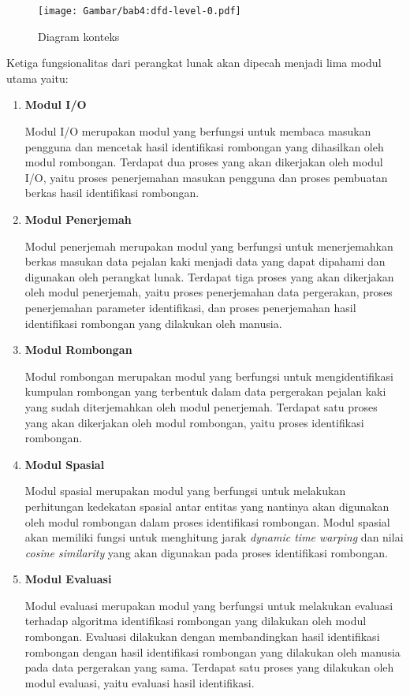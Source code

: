 \begin{figure}[h]
    \centering
    \texttt{[image: Gambar/bab4:dfd-level-0.pdf]}
    \caption{Diagram konteks}
    \label{bab4:context-diagram}
\end{figure}

\noindent Ketiga fungsionalitas dari perangkat lunak akan dipecah menjadi lima modul utama yaitu:

\begin{enumerate}
    \item \textbf{Modul I/O}
    
    Modul I/O merupakan modul yang berfungsi untuk membaca masukan pengguna dan mencetak hasil identifikasi rombongan yang dihasilkan oleh modul rombongan. Terdapat dua proses yang akan dikerjakan oleh modul I/O, yaitu proses penerjemahan masukan pengguna dan proses pembuatan berkas hasil identifikasi rombongan.
    
    \clearpage
    
    \item \textbf{Modul Penerjemah}
    
    Modul penerjemah merupakan modul yang berfungsi untuk menerjemahkan berkas masukan data pejalan kaki menjadi data yang dapat dipahami dan digunakan oleh perangkat lunak. Terdapat tiga proses yang akan dikerjakan oleh modul penerjemah, yaitu proses penerjemahan data pergerakan, proses penerjemahan parameter identifikasi, dan proses penerjemahan hasil identifikasi rombongan yang dilakukan oleh manusia.
    
    \item \textbf{Modul Rombongan}
    
    Modul rombongan merupakan modul yang berfungsi untuk mengidentifikasi kumpulan rombongan yang terbentuk dalam data pergerakan pejalan kaki yang sudah diterjemahkan oleh modul penerjemah. Terdapat satu proses yang akan dikerjakan oleh modul rombongan, yaitu proses identifikasi rombongan.

    \item \textbf{Modul Spasial}
    
    Modul spasial merupakan modul yang berfungsi untuk melakukan perhitungan kedekatan spasial antar entitas yang nantinya akan digunakan oleh modul rombongan dalam proses identifikasi rombongan. Modul spasial akan memiliki fungsi untuk menghitung jarak \textit{dynamic time warping} dan nilai \textit{cosine similarity} yang akan digunakan pada proses identifikasi rombongan.
    
    \item \textbf{Modul Evaluasi}
    
    Modul evaluasi merupakan modul yang berfungsi untuk melakukan evaluasi terhadap algoritma identifikasi rombongan yang dilakukan oleh modul rombongan. Evaluasi dilakukan dengan membandingkan hasil identifikasi rombongan dengan hasil identifikasi rombongan yang dilakukan oleh manusia pada data pergerakan yang sama. Terdapat satu proses yang dilakukan oleh modul evaluasi, yaitu evaluasi hasil identifikasi.
\end{enumerate}

